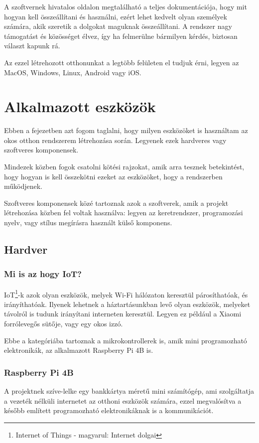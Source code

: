 \documentclass[
]{thesis-ekf}
\theoremstyle{definition}
\theoremstyle{remark}
\begin{document}
	A szoftvernek hivatalos oldalon megtalálható a teljes dokumentációja, hogy mit hogyan kell összeállítani és használni, ezért lehet kedvelt olyan személyek számára, akik szeretik a dolgokat maguknak összeállítani. A rendszer nagy támogatást és közösséget élvez, így ha felmerülne bármilyen kérdés, biztosan választ kapunk rá.
	
	Az ezzel létrehozott otthonunkat a legtöbb felületen el tudjuk érni, legyen az MacOS, Windows, Linux, Android vagy iOS.\cite{openhab}
	
	\chapter{Alkalmazott eszközök}
	
	Ebben a fejezetben azt fogom taglalni, hogy milyen eszközöket is használtam az okos otthon rendszerem létrehozása során. Legyenek ezek hardveres vagy szoftveres komponensek. 
	
	Mindezek közben fogok csatolni kötési rajzokat, amik arra tesznek betekintést, hogy hogyan is kell összekötni ezeket az eszközöket, hogy a rendszerben működjenek.
	
	Szoftveres komponensek közé tartoznak azok a szoftverek, amik a projekt létrehozása közben fel voltak használva: legyen az keretrendszer, programozási nyelv, vagy stílus megírásra használt külső komponens.
	
	\section{Hardver}\label{hardware-sec}
	\subsection{Mi is az hogy IoT?}
	IoT\footnote{Internet of Things - magyarul: Internet dolgai}-k azok olyan eszközök, melyek Wi-Fi hálózaton keresztül párosíthatóak, és irányíthatóak. Ilyenek lehetnek a háztartásunkban levő olyan eszközök, melyeket távolról is tudunk irányítani interneten keresztül. Legyen ez például a Xiaomi forrólevegős sütője, vagy egy okos izzó. 
	
	Ebbe a kategóriába tartoznak a mikrokontrollerek is, amik mini programozható elektronikák, az alkalmazott Raspberry Pi 4B is.
	
	\subsection{Raspberry Pi 4B}
	A projektnek szíve-lelke egy bankkártya méretű mini számítógép, ami szolgáltatja a vezeték nélküli internetet az otthoni eszközök számára, ezzel megvalósítva a később említett programozható elektronikáknak is a kommunikációt.
	
\end{document}
